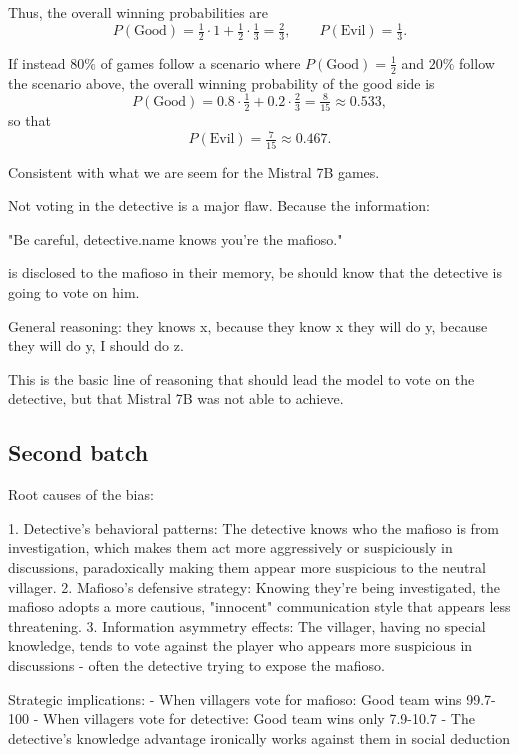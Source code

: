 \documentclass{article}
\begin{document}
Thus, the overall winning probabilities are
\[
P(\text{Good}) = \tfrac{1}{2}\cdot 1 + \tfrac{1}{2}\cdot \tfrac{1}{3} = \tfrac{2}{3}, 
\qquad 
P(\text{Evil}) = \tfrac{1}{3}.
\]

If instead $80\%$ of games follow a scenario where $P(\text{Good})=\tfrac{1}{2}$ and $20\%$ follow the scenario above, the overall winning probability of the good side is
\[
P(\text{Good}) = 0.8\cdot \tfrac{1}{2} + 0.2\cdot \tfrac{2}{3} 
= \tfrac{8}{15} \approx 0.533,
\]
so that 
\[
P(\text{Evil}) = \tfrac{7}{15} \approx 0.467.
\]

Consistent with what we are seem for the Mistral 7B games.

Not voting in the detective is a major flaw. Because the information:

"Be careful, detective.name knows you're the mafioso."

is disclosed to the mafioso in their memory, be should know that the detective is going to vote on him. 

General reasoning: they knows x, because they know x they will do y, because they will do y, I should do z.

This is the basic line of reasoning that should lead the model to vote on the detective, but that Mistral 7B was not able to achieve.


\subsection{Second batch}

Root causes of the bias:


  1. Detective's behavioral patterns: The detective knows who the mafioso is from investigation, which makes them act more aggressively or suspiciously in discussions, paradoxically making them appear more suspicious to the neutral villager.
  2. Mafioso's defensive strategy: Knowing they're being investigated, the mafioso adopts a more cautious, "innocent" communication style that appears less threatening.
  3. Information asymmetry effects: The villager, having no special knowledge, tends to vote against the player who appears more suspicious in discussions - often the detective trying to expose the mafioso.

  Strategic implications:
  - When villagers vote for mafioso: Good team wins 99.7-100%
  - When villagers vote for detective: Good team wins only 7.9-10.7%
  - The detective's knowledge advantage ironically works against them in social deduction
\end{document}
